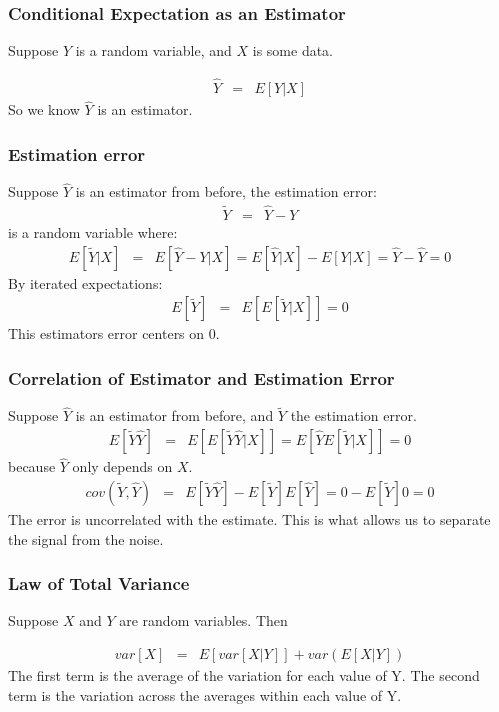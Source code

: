 \documentclass{beamer}
\numberwithin{equation}{section}
\begin{document}
\begin{frame}
\frametitle{Conditional Expectation as an Estimator}
Suppose $Y$ is a random variable, and $X$ is some data.

\begin{eqnarray}
\hat{Y} & = & E[Y|X] \nonumber 
\end{eqnarray}\pause
So we know $\hat{Y}$ is an estimator.\\


\end{frame}


\begin{frame}
\frametitle{Estimation error}
Suppose $\hat{Y}$ is an estimator from before, the estimation error:
\begin{eqnarray}
\tilde{Y} & = & \hat{Y}-Y \nonumber 
\end{eqnarray}\pause
is a random variable where:
\begin{eqnarray}
E[\tilde{Y}|X] & = & E[ \hat{Y}-Y|X]=E[ \hat{Y}|X]-E[Y|X]=\hat{Y} -\hat{Y} =0\nonumber 
\end{eqnarray}\pause
By iterated expectations:\pause
\begin{eqnarray}
E[\tilde{Y}] & = & E[E[ \tilde{Y}|X]]=0 \nonumber 
\end{eqnarray}\pause
This estimators error centers on 0.

\end{frame}


\begin{frame}
\frametitle{Correlation of  Estimator and Estimation Error}
Suppose $\hat{Y}$ is an estimator from before, and $\tilde{Y}$ the estimation error.
\begin{eqnarray}
E[\tilde{Y}\hat{Y}] & = & E[E[\tilde{Y}\hat{Y}|X]]=E[\hat{Y}E[\tilde{Y}|X]]=0 \nonumber 
\end{eqnarray}\pause
because $\hat{Y}$ only depends on $X$.\pause
\begin{eqnarray}
cov(\tilde{Y},\hat{Y}) & = & E[ \tilde{Y}\hat{Y}]-E[\tilde{Y}]E[\hat{Y}]=0- E[\tilde{Y}]0=0\nonumber 
\end{eqnarray}\pause
The error is uncorrelated with the estimate.  This is what allows us to separate the signal from the noise.
\end{frame}


\begin{frame}
\frametitle{Law of Total Variance}
Suppose $X$ and $Y$ are random variables.  Then 

\begin{eqnarray}
var[X] & = & E[var[X|Y]]+var(E[X|Y]) \nonumber 
\end{eqnarray}
The first term is the average of the variation for each value of Y.\pause
The second term is the variation across the averages within each value of Y.
\end{frame}
\end{document}
